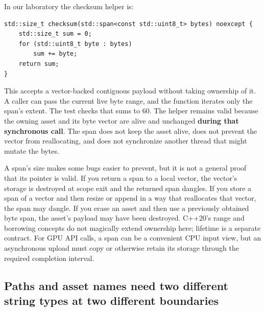 In our laboratory the checksum helper is:

\begin{verbatim}
std::size_t checksum(std::span<const std::uint8_t> bytes) noexcept {
    std::size_t sum = 0;
    for (std::uint8_t byte : bytes)
        sum += byte;
    return sum;
}
\end{verbatim}

This accepts a vector-backed contiguous payload without taking ownership of it. A caller can pass the current live byte range, and the function iterates only the span's extent. The test checks that  sums to 60. The helper remains valid because the owning asset and its byte vector are alive and unchanged \textbf{during that synchronous call}. The span does not keep the asset alive, does not prevent the vector from reallocating, and does not synchronize another thread that might mutate the bytes.

A span's size makes some bugs easier to prevent, but it is not a general proof that its pointer is valid. If you return a span to a local vector, the vector's storage is destroyed at scope exit and the returned span dangles. If you store a span of a vector and then resize or append in a way that reallocates that vector, the span may dangle. If you erase an asset and then use a previously obtained byte span, the asset's payload may have been destroyed. C++20's range and borrowing concepts do not magically extend ownership here; lifetime is a separate contract. For GPU API calls, a span can be a convenient CPU input view, but an asynchronous upload must copy or otherwise retain its storage through the required completion interval.

\subsection{Paths and asset names need two different string types at two different boundaries}\label{05-engine-i-ch005-paths-and-asset-names-need-two-different-string-types-at-two-different-boundaries}

\hypertarget{05-engine-i-ch005-paths-and-asset-names-need-two-different-string-types-at-two-different-boundaries}{}

